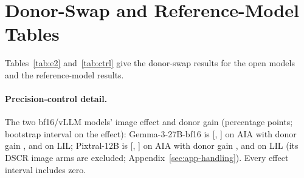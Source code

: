 \documentclass[11pt]{article}
\begin{document}
\section{Donor-Swap and Reference-Model Tables}
\label{sec:app-tables}

Tables~\ref{tab:e2} and~\ref{tab:ctrl} give the donor-swap results for the open models and the reference-model results.

\begin{table}[h]
\centering
\scriptsize
\setlength{\tabcolsep}{2pt}

\caption{E2: share of answers (\%) that equal the donor's key when the image is swapped, and when there is no image; the gain is the difference in percentage points, with its bootstrap interval, an add-half sparse-data interval (Add-half CI) and the exact McNemar $p$ (unadjusted); the last column is the share of items whose answer differs from the own-image answer after the swap. Sample sizes are the donor-paired items (AIA 46, LIL 38, DSCR 42); the own-image accuracy in Table~\ref{tab:e1} is over all items (DSCR 46).}
\label{tab:e2}
\end{table}

\begin{table}[h]
\centering
\footnotesize
\setlength{\tabcolsep}{3pt}

\caption{Reference model (Gemini-3.6-Flash): accuracy (\%) with the image and with text only, the paired difference, the share of swapped-image answers equal to the donor's key, and the donor-tracking gain (percentage points). Accuracy is over all items (AIA 46, LIL 38, DSCR 46); the swap and donor-key columns use the donor-paired items (AIA 46, LIL 38, DSCR 42).}
\label{tab:ctrl}
\end{table}

\paragraph{Precision-control detail.} The two bf16/vLLM models' image effect and donor gain (percentage points; bootstrap interval on the effect): Gemma-3-27B-bf16 is \vfourEoneDiffAIAGemmaTwentySevenBf{} [\vfourEoneLoAIAGemmaTwentySevenBf{}, \vfourEoneHiAIAGemmaTwentySevenBf{}] on AIA with donor gain \vfourEtwoGainAIAGemmaTwentySevenBf{}, and \vfourEoneDiffLILGemmaTwentySevenBf{} on LIL; Pixtral-12B is \vfourEoneDiffAIAPixtral{} [\vfourEoneLoAIAPixtral{}, \vfourEoneHiAIAPixtral{}] on AIA with donor gain \vfourEtwoGainAIAPixtral{}, and \vfourEoneDiffLILPixtral{} on LIL (its DSCR image arms are excluded; Appendix~\ref{sec:app-handling}). Every effect interval includes zero.
\end{document}
